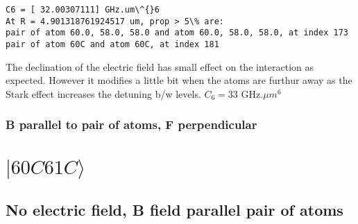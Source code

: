 \documentclass{article}
\begin{document}
    \begin{Verbatim}[commandchars=\\\{\}]
C6 = [ 32.00307111] GHz.um\^{}6
At R = 4.901318761924517 um, prop > 5\% are:
pair of atom 60.0, 58.0, 58.0 and atom 60.0, 58.0, 58.0, at index 173
pair of atom 60C and atom 60C, at index 181
    \end{Verbatim}

    The declination of the electric field has small effect on the
interaction as expected. However it modifies a little bit when the atoms
are furthur away as the Stark effect increases the detuning b/w levels.
\(C_6 = 33\) GHz\(.\mu m^6\)

\subsubsection{B parallel to pair of atoms, F
perpendicular}\label{b-parallel-to-pair-of-atoms-f-perpendicular}

    \section{\texorpdfstring{\(|60C61C\rangle\)}{\textbar{}60C61C\textbackslash{}rangle}}\label{c61crangle}

\subsection{No electric field, B field parallel pair of
atoms}\label{no-electric-field-b-field-parallel-pair-of-atoms}
\end{document}
